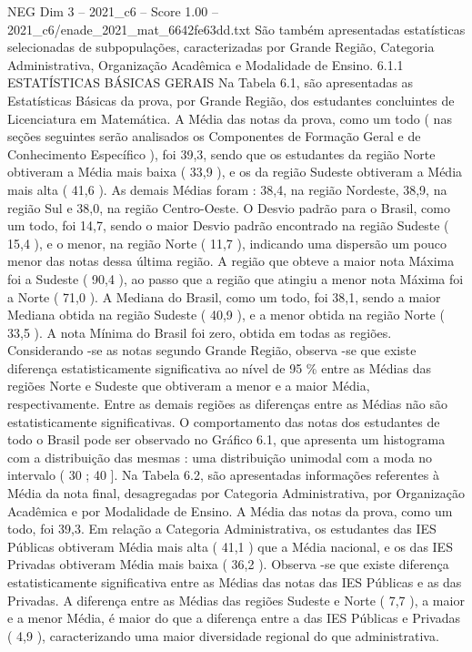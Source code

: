 \begin{textsample}{NEG Dim 3 – 2021\_c6 – Score 1.00 – 2021\_c6/enade\_2021\_mat\_6642fe63dd.txt}
São também apresentadas estatísticas selecionadas de subpopulações, caracterizadas por Grande Região, Categoria Administrativa, Organização Acadêmica e Modalidade de Ensino. 6.1.1 ESTATÍSTICAS BÁSICAS GERAIS Na Tabela 6.1, são apresentadas as Estatísticas Básicas da prova, por Grande Região, dos estudantes concluintes de Licenciatura em Matemática.
A Média das notas da prova, como um todo ( nas seções seguintes serão analisados os Componentes de Formação Geral e de Conhecimento Específico ), foi 39,3, sendo que os estudantes da região Norte obtiveram a Média mais baixa ( 33,9 ), e os da região Sudeste obtiveram a Média mais alta ( 41,6 ).
As demais Médias foram : 38,4, na região Nordeste, 38,9, na região Sul e 38,0, na região Centro-Oeste.
O Desvio padrão para o Brasil, como um todo, foi 14,7, sendo o maior Desvio padrão encontrado na região Sudeste ( 15,4 ), e o menor, na região Norte ( 11,7 ), indicando uma dispersão um pouco menor das notas dessa última região.
A região que obteve a maior nota Máxima foi a Sudeste ( 90,4 ), ao passo que a região que atingiu a menor nota Máxima foi a Norte ( 71,0 ).
A Mediana do Brasil, como um todo, foi 38,1, sendo a maior Mediana obtida na região Sudeste ( 40,9 ), e a menor obtida na região Norte ( 33,5 ).
A nota Mínima do Brasil foi zero, obtida em todas as regiões.
Considerando -se as notas segundo Grande Região, observa -se que existe diferença estatisticamente significativa ao nível de 95 \% entre as Médias das regiões Norte e Sudeste que obtiveram a menor e a maior Média, respectivamente.
Entre as demais regiões as diferenças entre as Médias não são estatisticamente significativas.
O comportamento das notas dos estudantes de todo o Brasil pode ser observado no Gráfico 6.1, que apresenta um histograma com a distribuição das mesmas : uma distribuição unimodal com a moda no intervalo ( 30 ; 40 ].
Na Tabela 6.2, são apresentadas informações referentes à Média da nota final, desagregadas por Categoria Administrativa, por Organização Acadêmica e por Modalidade de Ensino.
A Média das notas da prova, como um todo, foi 39,3.
Em relação a Categoria Administrativa, os estudantes das IES Públicas obtiveram Média mais alta ( 41,1 ) que a Média nacional, e os das IES Privadas obtiveram Média mais baixa ( 36,2 ).
Observa -se que existe diferença estatisticamente significativa entre as Médias das notas das IES Públicas e as das Privadas.
A diferença entre as Médias das regiões Sudeste e Norte ( 7,7 ), a maior e a menor Média, é maior do que a diferença entre a das IES Públicas e Privadas ( 4,9 ), caracterizando uma maior diversidade regional do que administrativa.

\end{textsample}
